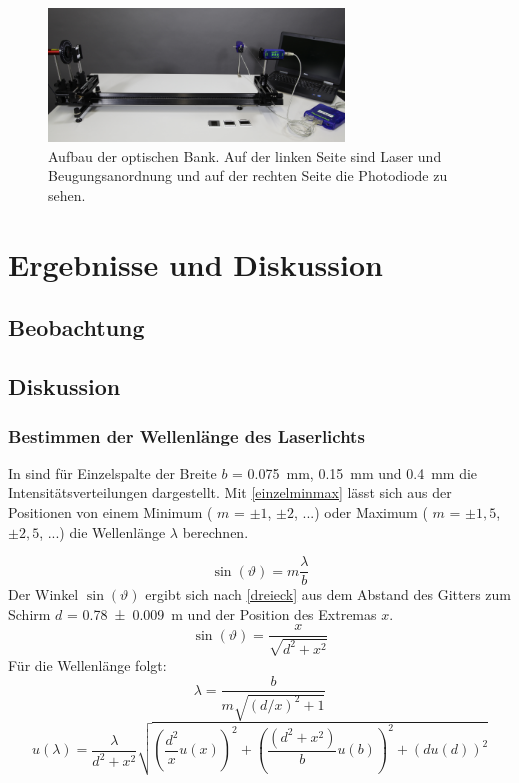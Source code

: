 \documentclass[
	a4paper,
	12pt,
	pagesize,
	ngerman
]{scrartcl}
\begin{document}
	\begin{figure}[H]
		\includegraphics[width=0.7\textwidth]{optischeBank}
		\centering
		\caption{Aufbau der optischen Bank. Auf der linken Seite sind Laser und Beugungsanordnung und auf der rechten Seite die Photodiode zu sehen.\cite{optischeBank} }
		\label{optischeBank}
		\centering
	\end{figure} 
	
	\section{Ergebnisse und Diskussion}
	

	\subsection{Beobachtung}

	\subsection{Diskussion}
	
	\subsubsection{Bestimmen der Wellenlänge des Laserlichts}
	In  sind für Einzelspalte der Breite $b$ = \SI{0,075}{mm}, \SI{0,15}{mm} und \SI{0,4}{mm} die Intensitätsverteilungen dargestellt. 
	Mit \cref{einzelminmax} lässt sich aus der Positionen von einem Minimum ( $m$ = $\pm1$, $\pm 2$, ...) oder Maximum ( $m$ = $\pm1,5$, $\pm 2,5$, ...) die Wellenlänge $\lambda$ berechnen. 
	
	\begin{equation}
		\sin(\vartheta) = m \frac{\lambda}{b}
		\label{einzelminmax}
	\end{equation}
	Der Winkel $\sin(\vartheta)$ ergibt sich nach \cref{dreieck} aus dem Abstand des Gitters zum Schirm $d$ = \SI{0,78 +- 0,009}{m} und der Position des Extremas $x$. 
	\begin{equation}
		\sin(\vartheta) = \frac{x}{\sqrt{d^2 + x^2}}
		\label{dreieck}
	\end{equation}
	Für die Wellenlänge folgt:
	\begin{equation}
		\lambda = \frac{b}{m\sqrt{(d/x)^2 + 1}}
	\end{equation}
	\begin{equation}
	u(\lambda) = \frac{\lambda}{d^2+x^2} \sqrt{\left( \frac{d^2}{x} u(x)\right)^2 + \left( \frac{(d^2+ x^2)}{b}u(b) \right) ^2 + \left( du(d) \right)^2}
	\end{equation}
	
\end{document}
